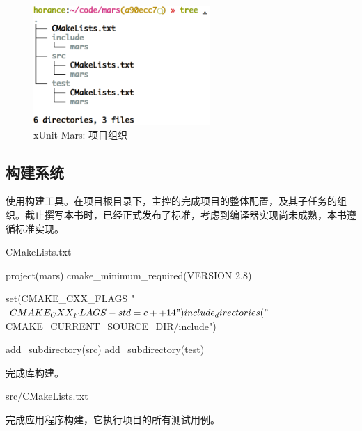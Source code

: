 \begin{content}
\begin{figure}[H]
\centering
\includegraphics[width=0.6\textwidth]{figures/xunit/mars-project.png}
\caption{xUnit Mars: 项目组织}
 \label{fig:mars-project}
\end{figure}

\subsection{构建系统}

使用构建工具。在项目根目录下，主控的完成项目的整体配置，及其子任务的组织。截止撰写本书时，已经正式发布了标准，考虑到编译器实现尚未成熟，本书遵循标准实现。

\begin{nodiff}{CMakeLists.txt}
 \begin{c++}
project(mars)                                                                                  
cmake_minimum_required(VERSION 2.8)

set(CMAKE_CXX_FLAGS "${CMAKE_CXX_FLAGS} -std=c++14")

include_directories("${CMAKE_CURRENT_SOURCE_DIR}/include")

add_subdirectory(src)
add_subdirectory(test)
 \end{c++}
\end{nodiff}

完成库构建。

\begin{nodiff}{src/CMakeLists.txt}
\end{nodiff}

完成应用程序构建，它执行项目的所有测试用例。


\end{content}
